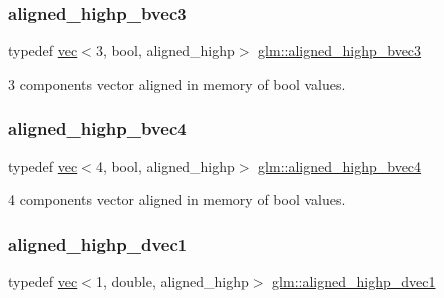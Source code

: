 \subsubsection{\texorpdfstring{aligned\+\_\+highp\+\_\+bvec3}{aligned\_highp\_bvec3}}
{\footnotesize\ttfamily typedef \hyperlink{structglm_1_1vec}{vec}$<$3, bool, aligned\+\_\+highp$>$ \hyperlink{group__gtc__type__aligned_ga224220a3fc5e5220141a568270cfb405}{glm\+::aligned\+\_\+highp\+\_\+bvec3}}



3 components vector aligned in memory of bool values. 

\mbox{\label{group__gtc__type__aligned_ga833e4cd7402677f8ca56795a12d8bec0}} 
\subsubsection{\texorpdfstring{aligned\+\_\+highp\+\_\+bvec4}{aligned\_highp\_bvec4}}
{\footnotesize\ttfamily typedef \hyperlink{structglm_1_1vec}{vec}$<$4, bool, aligned\+\_\+highp$>$ \hyperlink{group__gtc__type__aligned_ga833e4cd7402677f8ca56795a12d8bec0}{glm\+::aligned\+\_\+highp\+\_\+bvec4}}



4 components vector aligned in memory of bool values. 

\mbox{\label{group__gtc__type__aligned_ga85671dcb7eef983b5035273fe78dd963}} 
\subsubsection{\texorpdfstring{aligned\+\_\+highp\+\_\+dvec1}{aligned\_highp\_dvec1}}
{\footnotesize\ttfamily typedef \hyperlink{structglm_1_1vec}{vec}$<$1, double, aligned\+\_\+highp$>$ \hyperlink{group__gtc__type__aligned_ga85671dcb7eef983b5035273fe78dd963}{glm\+::aligned\+\_\+highp\+\_\+dvec1}}



